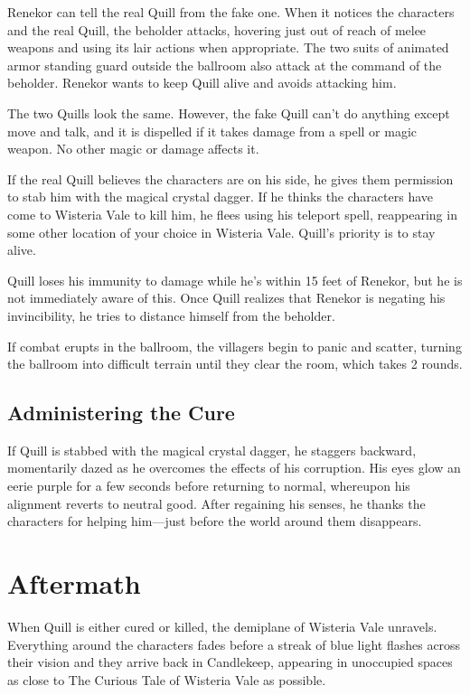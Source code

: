 \documentclass[10pt,a4paper,twoside,bg=print,twocolumn,openany,nodeprecatedcode]{dndbook}
\begin{document}
Renekor can tell the real Quill from the fake one. When it notices the characters and the real Quill, the beholder attacks, hovering just out of reach of melee weapons and using its lair actions when appropriate. The two suits of animated armor standing guard outside the ballroom also attack at the command of the beholder. Renekor wants to keep Quill alive and avoids attacking him.

The two Quills look the same. However, the fake Quill can't do anything except move and talk, and it is dispelled if it takes damage from a spell or magic weapon. No other magic or damage affects it.

If the real Quill believes the characters are on his side, he gives them permission to stab him with the magical crystal dagger. If he thinks the characters have come to Wisteria Vale to kill him, he flees using his teleport spell, reappearing in some other location of your choice in Wisteria Vale. Quill's priority is to stay alive.

Quill loses his immunity to damage while he's within 15 feet of Renekor, but he is not immediately aware of this. Once Quill realizes that Renekor is negating his invincibility, he tries to distance himself from the beholder.

If combat erupts in the ballroom, the villagers begin to panic and scatter, turning the ballroom into difficult terrain until they clear the room, which takes 2 rounds.

\subsection{Administering the Cure}
If Quill is stabbed with the magical crystal dagger, he staggers backward, momentarily dazed as he overcomes the effects of his corruption. His eyes glow an eerie purple for a few seconds before returning to normal, whereupon his alignment reverts to neutral good. After regaining his senses, he thanks the characters for helping him—just before the world around them disappears.

\section{Aftermath}
When Quill is either cured or killed, the demiplane of Wisteria Vale unravels. Everything around the characters fades before a streak of blue light flashes across their vision and they arrive back in Candlekeep, appearing in unoccupied spaces as close to The Curious Tale of Wisteria Vale as possible.
\end{document}
